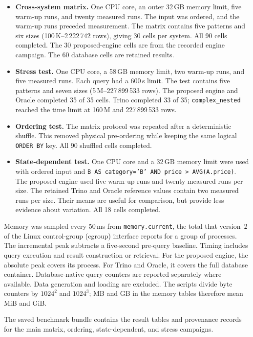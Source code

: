 \begin{itemize}
  \item \textbf{Cross-system matrix.} One CPU core, an outer 32\,GB memory
    limit, five warm-up runs, and twenty measured runs.  The input was ordered, and
    the warm-up runs preceded measurement.  The matrix contains five patterns and six
    sizes (100\,K--2\,222\,742 rows), giving 30 cells per system.
    All 90 cells completed.  The 30 proposed-engine cells are from the
    recorded engine campaign.  The 60 database cells are retained results.
  \item \textbf{Stress test.} One CPU core, a 58\,GB memory limit, two warm-up runs,
    and five measured runs.  Each query had a 600\,s limit.  The test
    contains five patterns and seven sizes (5\,M--227\,899\,533 rows).
    The proposed engine and Oracle completed 35 of 35 cells.  Trino
    completed 33 of 35; \texttt{complex\_nested} reached the time
    limit at 160\,M and 227\,899\,533 rows.
  \item \textbf{Ordering test.} The matrix protocol was repeated after
    a deterministic shuffle.  This removed physical pre-ordering while
    keeping the same logical \texttt{ORDER BY} key.  All 90 shuffled
    cells completed.
  \item \textbf{State-dependent test.} One CPU core and a 32\,GB memory limit were
    used with ordered input and
    \texttt{B AS category='B' AND price > AVG(A.price)}.  The proposed
    engine used five warm-up runs and twenty measured runs per size.
    The retained Trino and Oracle reference values contain two
    measured runs per size.  Their means are useful for comparison,
    but provide less evidence about variation.  All 18 cells completed.
\end{itemize}

Memory was sampled every 50\,ms from \texttt{memory.current}, the
total that version~2 of the Linux control-group (cgroup) interface
reports for a group of processes.  The incremental peak subtracts a
five-second pre-query baseline.  Timing includes query execution and result construction or
retrieval.  For the proposed engine, the absolute peak covers its
process.  For Trino and Oracle, it covers the full database container.
Database-native query counters are reported separately where
available.  Data generation and loading are excluded.
The scripts divide byte counters by $1024^2$ and $1024^3$; MB and GB in
the memory tables therefore mean MiB and GiB.

The saved benchmark bundle contains the result tables and provenance
records for the main matrix, ordering, state-dependent, and stress
campaigns.

